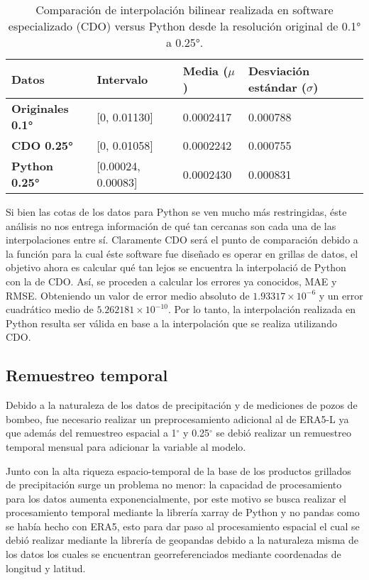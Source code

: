     \begin{table}[H] 
        \caption[Comparación de interpolaciones Python/CDO]{Comparación de interpolación bilinear realizada en software especializado (CDO) versus Python desde la resolución original de 0.1° a 0.25°.}
        \begin{tabularx}{0.9\textwidth }{CCCC}
        \toprule
         \textbf{Datos}& \textbf{Intervalo}	&\textbf{Media ($\mu$)}  &\textbf{Desviación estándar ($\sigma$)}\\
            \midrule
            \textbf{Originales 0.1°}	&	[0, 0.01130]       &  0.0002417  & 0.000788\\
            \textbf{CDO 0.25°}	        &   [0, 0.01058]       &  0.0002242  & 0.000755\\
            \textbf{Python 0.25°}       &   [0.00024, 0.00083] &  0.0002430  & 0.000831\\
            \bottomrule
        \end{tabularx}
    \end{table}

    Si bien las cotas de los datos para Python se ven mucho más restringidas, éste análisis no nos entrega información de qué tan cercanas son cada una de las interpolaciones entre sí. Claramente CDO será el punto de comparación debido a 
    la función para la cual éste software fue diseñado es operar en grillas de datos, el objetivo ahora es calcular qué tan lejos se encuentra la interpolació de Python con la de CDO.
    Así, se proceden a calcular los errores ya conocidos, MAE y RMSE. Obteniendo un valor de error medio absoluto de $1.93317\times 10^{-6}$ y un error cuadrático medio de $5.262181\times 10^{-10}$. Por lo tanto, 
    la interpolación realizada en Python resulta ser válida en base a la interpolación que se realiza utilizando CDO.


    \subsection{Remuestreo temporal}
    Debido a la naturaleza de los datos de precipitación y de mediciones de pozos de bombeo, fue necesario realizar un preprocesamiento 
    adicional al de ERA5-L ya que además del remuestreo espacial a 1$^\circ$ y 0.25$^\circ$ se debió realizar un remuestreo temporal
    mensual para adicionar la variable al modelo.

    Junto con la alta riqueza espacio-temporal de la base de los productos grillados de precipitación surge un problema no menor: la capacidad de procesamiento para los datos aumenta
    exponencialmente, por este motivo se busca realizar el procesamiento temporal mediante la librería xarray de Python y no pandas como se había hecho con
    ERA5, esto para dar paso al procesamiento espacial el cual se debió realizar mediante la librería de geopandas debido a la naturaleza misma de los datos
    los cuales se encuentran georreferenciados mediante coordenadas de longitud y latitud.

